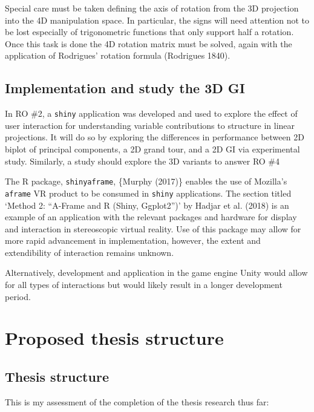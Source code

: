\documentclass[
  11,
]{article}
\begin{document}
Special care must be taken defining the axis of rotation from the 3D projection into the 4D manipulation space. In particular, the signs will need attention not to be lost especially of trigonometric functions that only support half a rotation. Once this task is done the 4D rotation matrix must be solved, again with the application of Rodrigues' rotation formula (Rodrigues 1840).

\hypertarget{implementation-and-study-the-3d-gi}{%
\subsection{Implementation and study the 3D GI}\label{implementation-and-study-the-3d-gi}}

In RO \#2, a \texttt{shiny} application was developed and used to explore the effect of user interaction for understanding variable contributions to structure in linear projections. It will do so by exploring the differences in performance between 2D biplot of principal components, a 2D grand tour, and a 2D GI via experimental study. Similarly, a study should explore the 3D variants to answer RO \#4

The R package, \texttt{shinyaframe}, \{Murphy (2017)\} enables the use of Mozilla's \texttt{aframe} VR product to be consumed in \texttt{shiny} applications. The section titled `Method 2: ``A-Frame and R (Shiny, Ggplot2'')' by Hadjar et al. (2018) is an example of an application with the relevant packages and hardware for display and interaction in stereoscopic virtual reality. Use of this package may allow for more rapid advancement in implementation, however, the extent and extendibility of interaction remains unknown.

Alternatively, development and application in the game engine Unity would allow for all types of interactions but would likely result in a longer development period.

\hypertarget{proposed-thesis-structure}{%
\section{Proposed thesis structure}\label{proposed-thesis-structure}}

\hypertarget{thesis-structure}{%
\subsection{Thesis structure}\label{thesis-structure}}

This is my assessment of the completion of the thesis research thus far:
\end{document}
